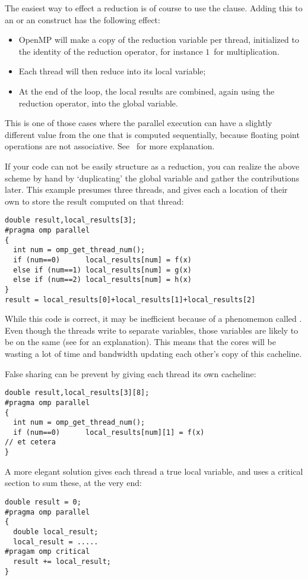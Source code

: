 The easiest way to effect a reduction is of course to use the 
clause. Adding this to an  or an  construct
has the following effect:
\begin{itemize}
\item OpenMP will make a copy of the reduction variable per thread,
  initialized to the identity of the reduction operator, for instance
  $1$~for multiplication.
\item Each thread will then reduce into its local variable;
\item At the end of the loop, the local results are combined, again
  using the reduction operator, into the global variable.
\end{itemize}
This is one of those cases where the parallel execution can have a slightly different
value from the one that is computed sequentially, because floating point operations
are not associative. See~ for more explanation.

If your code can not be easily structure as a reduction, you can 
realize the above scheme by hand by
`duplicating' the global variable and gather the contributions later.
This example presumes three threads, and gives each a location of their
own to store the result computed on that thread:
\begin{verbatim}
double result,local_results[3];
#pragma omp parallel
{
  int num = omp_get_thread_num();
  if (num==0)      local_results[num] = f(x)
  else if (num==1) local_results[num] = g(x)
  else if (num==2) local_results[num] = h(x)
}
result = local_results[0]+local_results[1]+local_results[2]
\end{verbatim}
While this code is correct, it may be inefficient because of a
phenomemon called . Even though the threads write
to separate variables, those variables are likely to be on the same 
 (see  for an explanation).
This means that the cores will be wasting a lot of time and bandwidth updating
each other's copy of this cacheline.

False sharing can be prevent by giving each thread its own cacheline:
\begin{verbatim}
double result,local_results[3][8];
#pragma omp parallel
{
  int num = omp_get_thread_num();
  if (num==0)      local_results[num][1] = f(x)
// et cetera
}
\end{verbatim}
A more elegant solution gives each thread a true local variable,
and uses a critical section to sum these, at the very end:
\begin{verbatim}
double result = 0;
#pragma omp parallel
{
  double local_result;
  local_result = .....
#pragam omp critical
  result += local_result;
}
\end{verbatim}

